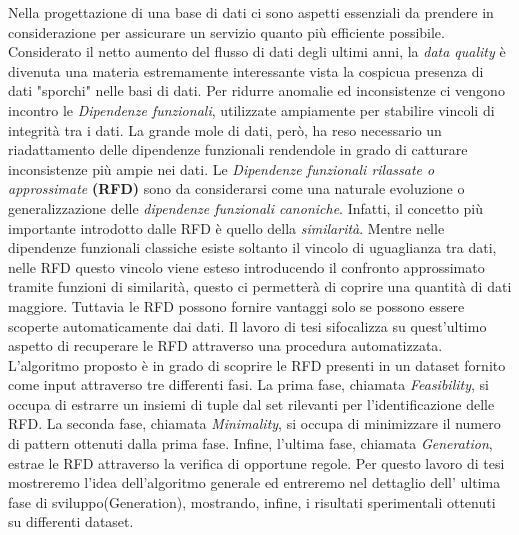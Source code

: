 Nella progettazione di una base di dati ci sono aspetti essenziali da prendere in considerazione per assicurare un servizio quanto più efficiente possibile.
Considerato il netto aumento del flusso di dati degli ultimi anni,  la \emph{data quality} è divenuta una materia estremamente interessante vista la cospicua presenza di dati "sporchi" nelle basi di dati.
Per ridurre anomalie ed inconsistenze ci vengono incontro le \emph{Dipendenze funzionali}, utilizzate ampiamente per stabilire vincoli di integrità tra i dati.
La grande mole di dati, però, ha reso necessario un riadattamento delle dipendenze funzionali rendendole in grado di catturare inconsistenze più ampie nei dati. 
Le \emph{Dipendenze funzionali rilassate o approssimate} \textbf{(RFD)} sono da considerarsi come una naturale evoluzione o generalizzazione delle \emph{dipendenze funzionali canoniche}. Infatti,
il concetto più importante introdotto dalle RFD è quello della \emph{similarità}.
Mentre nelle dipendenze funzionali classiche esiste soltanto il vincolo di uguaglianza tra dati, nelle RFD questo vincolo viene esteso introducendo il confronto approssimato tramite funzioni di similarità, questo ci permetterà di coprire una quantità di dati maggiore.
Tuttavia le RFD possono fornire vantaggi solo se possono essere scoperte automaticamente dai dati.
Il lavoro di tesi sifocalizza su quest'ultimo aspetto di recuperare le RFD attraverso una procedura automatizzata.
L'algoritmo proposto è in grado di scoprire le RFD presenti in un dataset fornito come input attraverso tre differenti fasi. La prima fase, chiamata \emph{Feasibility}, si occupa di estrarre un insiemi di tuple dal set rilevanti per l'identificazione delle RFD. La seconda fase, chiamata \emph{Minimality}, si occupa di minimizzare il numero di pattern ottenuti dalla prima fase. Infine, l'ultima fase, chiamata \emph{Generation}, estrae le RFD attraverso la verifica di opportune regole.
Per questo lavoro di tesi mostreremo l'idea dell'algoritmo generale ed entreremo nel dettaglio dell' ultima fase di sviluppo(Generation), mostrando, infine, i risultati sperimentali ottenuti su differenti dataset.
